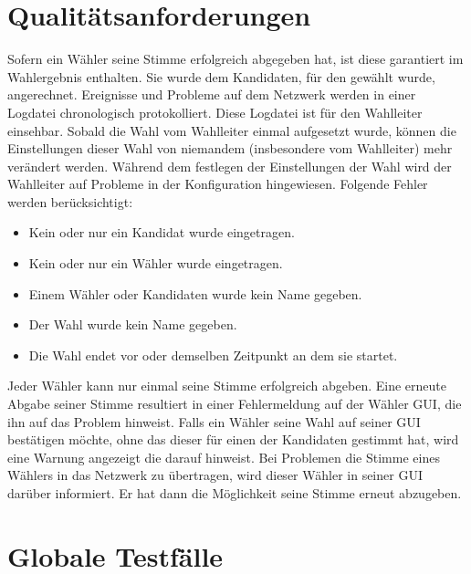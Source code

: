 \documentclass[parskip=full,11pt,twoside]{scrartcl}
\begin{document}
\section{Qualitätsanforderungen}
Sofern ein Wähler seine Stimme erfolgreich abgegeben hat, ist diese garantiert im Wahlergebnis enthalten. Sie wurde dem Kandidaten, für den gewählt wurde, angerechnet.
Ereignisse und Probleme auf dem \gls{Netzwerk} werden in einer \gls{Logdatei} chronologisch protokolliert. Diese \gls{Logdatei} ist für den \gls{Wahlleiter} einsehbar.
Sobald die Wahl vom \gls{Wahlleiter} einmal aufgesetzt wurde, können die Einstellungen dieser Wahl von niemandem (insbesondere vom \gls{Wahlleiter}) mehr verändert werden.
Während dem festlegen der Einstellungen der Wahl wird der \gls{Wahlleiter} auf Probleme in der \gls{Konfiguration} hingewiesen. Folgende Fehler werden berücksichtigt:
	\begin{itemize}
		\item Kein oder nur ein Kandidat wurde eingetragen.
		\item Kein oder nur ein Wähler wurde eingetragen.
		\item Einem Wähler oder Kandidaten wurde kein Name gegeben.
		\item Der Wahl wurde kein Name gegeben.
		\item Die Wahl endet vor oder demselben Zeitpunkt an dem sie startet.
	\end{itemize}
Jeder Wähler kann nur einmal seine Stimme erfolgreich abgeben. Eine erneute Abgabe seiner Stimme resultiert in einer Fehlermeldung auf der Wähler GUI, die ihn auf das Problem hinweist.
Falls ein Wähler seine Wahl auf seiner GUI bestätigen möchte, ohne das dieser für einen der Kandidaten gestimmt hat, wird eine Warnung angezeigt die darauf hinweist.
Bei Problemen die Stimme eines Wählers in das \gls{Netzwerk} zu übertragen, wird dieser Wähler in seiner GUI darüber informiert. Er hat dann die Möglichkeit seine Stimme erneut abzugeben. 

\section{Globale Testfälle}
\end{document}
